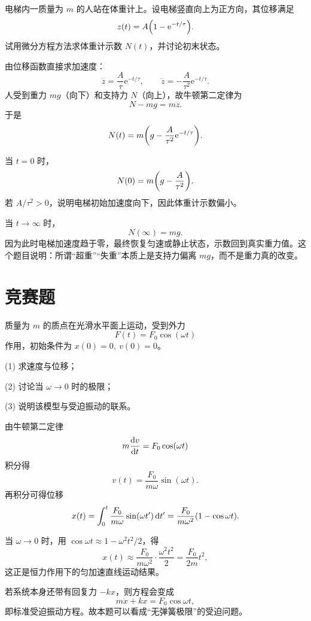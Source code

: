 \begin{classic}
电梯内一质量为 $m$ 的人站在体重计上。设电梯竖直向上为正方向，其位移满足
\[
z(t)=A\qty(1-\mathrm e^{-t/\tau}).
\]
试用微分方程方法求体重计示数 $N(t)$，并讨论初末状态。

\begin{solution}
由位移函数直接求加速度：
\[
\dot z=\frac{A}{\tau}\mathrm e^{-t/\tau},
\qquad
\ddot z=-\frac{A}{\tau^2}\mathrm e^{-t/\tau}.
\]
人受到重力 $mg$（向下）和支持力 $N$（向上），故牛顿第二定律为
\[
N-mg=m\ddot z.
\]
于是
\[
N(t)=m\qty(g-\frac{A}{\tau^2}\mathrm e^{-t/\tau}).
\]

当 $t=0$ 时，
\[
N(0)=m\qty(g-\frac{A}{\tau^2}).
\]
若 $A/\tau^2>0$，说明电梯初始加速度向下，因此体重计示数偏小。

当 $t\to\infty$ 时，
\[
N(\infty)=mg.
\]
因为此时电梯加速度趋于零，最终恢复匀速或静止状态，示数回到真实重力值。这个题目说明：所谓“超重”“失重”本质上是支持力偏离 $mg$，而不是重力真的改变。
\end{solution}
\end{classic}

\section*{竞赛题}

\begin{competition}
质量为 $m$ 的质点在光滑水平面上运动，受到外力
\[
F(t)=F_0\cos(\omega t)
\]
作用，初始条件为 $x(0)=0,\ v(0)=0$。

(1) 求速度与位移；

(2) 讨论当 $\omega\to 0$ 时的极限；

(3) 说明该模型与受迫振动的联系。

\begin{solution}
由牛顿第二定律
\[
m\dv{v}{t}=F_0\cos(\omega t)
\]
积分得
\[
v(t)=\frac{F_0}{m\omega}\sin(\omega t).
\]
再积分可得位移
\[
x(t)=\int_0^t \frac{F_0}{m\omega}\sin(\omega t')\,\dd t'
=\frac{F_0}{m\omega^2}\qty(1-\cos\omega t).
\]

当 $\omega\to 0$ 时，用 $\cos\omega t\approx 1-\omega^2 t^2/2$，得
\[
x(t)\approx \frac{F_0}{m\omega^2}\cdot \frac{\omega^2 t^2}{2}=\frac{F_0}{2m}t^2,
\]
这正是恒力作用下的匀加速直线运动结果。

若系统本身还带有回复力 $-kx$，则方程会变成
\[
m\ddot x+kx=F_0\cos\omega t,
\]
即标准受迫振动方程。故本题可以看成“无弹簧极限”的受迫问题。
\end{solution}
\end{competition}

